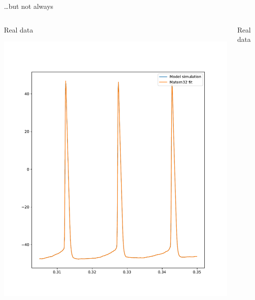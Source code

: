 \documentclass[presentation]{beamer}
\begin{document}
\begin{frame}[plain,label={sec:org973ac53}]{\ldots{}but not always}
\begin{columns}
\begin{column}{0.5\columnwidth}
\begin{center}
Real data
\end{center}

\begin{center}
\includegraphics[width=1.1\textwidth]{./Matern5.pdf}
\end{center}
\end{column}

\begin{column}{0.5\columnwidth}
\begin{center}
Real data
\end{center}


\end{column}
\end{columns}
\end{frame}
\end{document}
